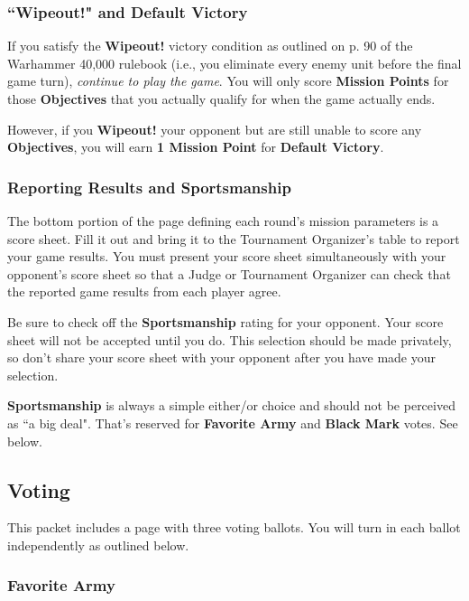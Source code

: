 \documentclass[12pt,titlepage]{article}
\begin{document}
\subsubsection*{``Wipeout!" and Default Victory}

If you satisfy the \textbf{Wipeout!} victory condition as outlined on p. 90 of the Warhammer 40,000 rulebook (i.e., you eliminate every enemy unit before the final game turn), \textit{continue to play the game}. You will only score \textbf{Mission Points} for those \textbf{Objectives} that you actually qualify for when the game actually ends.

However, if you \textbf{Wipeout!} your opponent but are still unable to score any \textbf{Objectives}, you will earn \textbf{1 Mission Point} for \textbf{Default Victory}.

\subsubsection*{Reporting Results and Sportsmanship}

The bottom portion of the page defining each round's mission parameters is a score sheet. Fill it out and bring it to the Tournament Organizer's table to report your game results. You must present your score sheet simultaneously with your opponent's score sheet so that a Judge or Tournament Organizer can check that the reported game results from each player agree.

Be sure to check off the \textbf{Sportsmanship} rating for your opponent. Your score sheet will not be accepted until you do. This selection should be made privately, so don't share your score sheet with your opponent after you have made your selection.

\textbf{Sportsmanship} is always a simple either/or choice and should not be perceived as ``a big deal". That's reserved for \textbf{Favorite Army} and \textbf{Black Mark} votes. See below.

\subsection*{Voting}

This packet includes a page with three voting ballots. You will turn in each ballot independently as outlined below.

\subsubsection*{Favorite Army}
\end{document}
